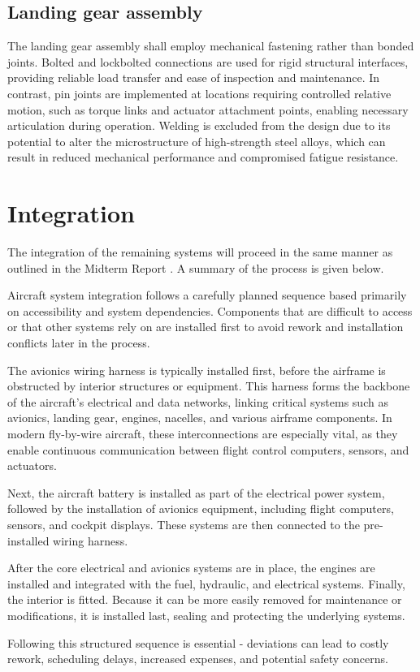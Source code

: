 \subsection{Landing gear assembly}
\label{sub:lg_assembly}

The landing gear assembly shall employ mechanical fastening rather than bonded joints. Bolted and lockbolted connections are used for rigid structural interfaces, providing reliable load transfer and ease of inspection and maintenance. In contrast, pin joints are implemented at locations requiring controlled relative motion, such as torque links and actuator attachment points, enabling necessary articulation during operation. Welding is excluded from the design due to its potential to alter the microstructure of high-strength steel alloys, which can result in reduced mechanical performance and compromised fatigue resistance.

\section{Integration}
\label{sec:integration}

The integration of the remaining systems will proceed in the same manner as outlined in the Midterm Report . A summary of the process is given below.

Aircraft system integration follows a carefully planned sequence based primarily on accessibility and system dependencies. Components that are difficult to access or that other systems rely on are installed first to avoid rework and installation conflicts later in the process.

The avionics wiring harness is typically installed first, before the airframe is obstructed by interior structures or equipment. This harness forms the backbone of the aircraft’s electrical and data networks, linking critical systems such as avionics, landing gear, engines, nacelles, and various airframe components. In modern fly-by-wire aircraft, these interconnections are especially vital, as they enable continuous communication between flight control computers, sensors, and actuators.

Next, the aircraft battery is installed as part of the electrical power system, followed by the installation of avionics equipment, including flight computers, sensors, and cockpit displays. These systems are then connected to the pre-installed wiring harness.

After the core electrical and avionics systems are in place, the engines are installed and integrated with the fuel, hydraulic, and electrical systems. Finally, the interior is fitted. Because it can be more easily removed for maintenance or modifications, it is installed last, sealing and protecting the underlying systems.

Following this structured sequence is essential - deviations can lead to costly rework, scheduling delays, increased expenses, and potential safety concerns.

